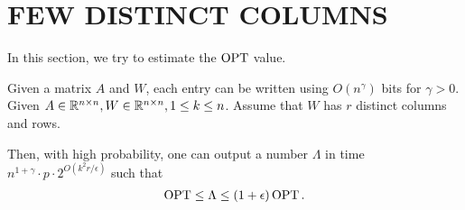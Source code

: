 
\section{FEW DISTINCT COLUMNS}\label{sec:few_distinct_columns}

In this section, we try to estimate the $\operatorname{OPT}$ value. 

\begin{theorem}\label{thm:few_distinct_columns}
Given a matrix $A$ and $W$, each entry can be written using $O(n^{\gamma})$ bits for $\gamma >0$.
Given $A \in \mathbb{R}^{n \times n}, W \in \mathbb{R}^{n \times n}, 1 \leq k \leq n$.  Assume that $W$ has $r$ distinct columns and rows.
   
Then, with high probability,  
one can output a number $\Lambda$ in time $n^{1+\gamma} \cdot p \cdot 2^{O (k^2 r / \epsilon )} $ such that 
\begin{align*}
    \operatorname{OPT} \leq \Lambda \leq(1+\epsilon) \operatorname{OPT} .
\end{align*}
\end{theorem}
